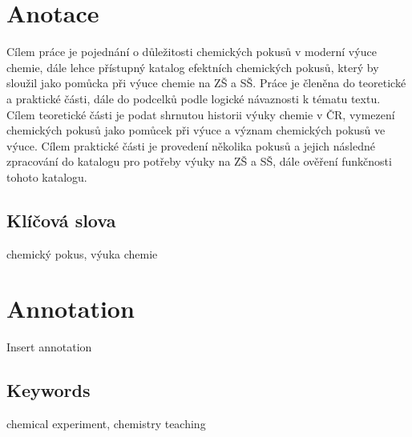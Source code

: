 \documentclass{template/socthesis}
\author{Jan Romanovský}
\begin{document}
	\maketitle


	\pagestyle{empty}

	\section*{Anotace}
	Cílem práce je pojednání o důležitosti chemických pokusů v moderní výuce chemie, dále lehce přístupný katalog efektních chemických pokusů, který by sloužil jako pomůcka při výuce chemie na ZŠ a SŠ. Práce je členěna do teoretické a praktické části, dále do podcelků podle logické návaznosti k tématu textu.
	Cílem teoretické části je podat shrnutou historii výuky chemie v ČR, vymezení chemických pokusů jako pomůcek při výuce a význam chemických pokusů ve výuce.
	Cílem praktické části je provedení několika pokusů a jejich následné zpracování do katalogu pro potřeby výuky na ZŠ a SŠ, dále ověření funkčnosti tohoto katalogu.

	\subsection*{Klíčová slova}
	chemický pokus, výuka chemie

	\vspace{20mm}

	\section*{Annotation}
	Insert annotation

	\subsection*{Keywords}
	chemical experiment, chemistry teaching

	\newpage
	\pagestyle{plain}

    \tableofcontents %

	\setcounter{figure}{0}
	\setcounter{table}{0}
	\newpage

	

	

	

	

	\newpage
	\printbibliography[title=Literatura]



\end{document}
